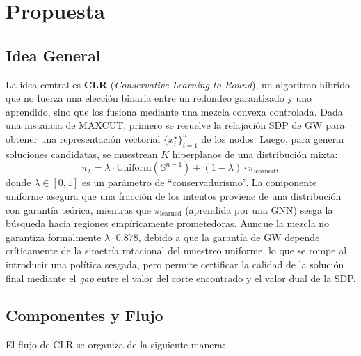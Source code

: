 \documentclass{article}
\begin{document}
\section{Propuesta}

\subsection{Idea General}

La idea central es \textbf{CLR} (\textit{Conservative Learning-to-Round}), un algoritmo híbrido que no fuerza una elección binaria entre un redondeo garantizado y uno aprendido, sino que los fusiona mediante una mezcla convexa controlada. Dada una instancia de MAXCUT, primero se resuelve la relajación SDP de GW para obtener una representación vectorial $\{x_i^\star\}_{i=1}^n$ de los nodos. Luego, para generar soluciones candidatas, se muestrean $K$ hiperplanos de una distribución mixta:
\[
\pi_\lambda = \lambda \cdot \text{Uniform}(\mathbb{S}^{n-1}) + (1 - \lambda) \cdot \pi_{\text{learned}},
\]
donde $\lambda \in [0, 1]$ es un parámetro de ``conservadurismo''. La componente uniforme asegura que una fracción de los intentos proviene de una distribución con garantía teórica, mientras que $\pi_{\text{learned}}$ (aprendida por una GNN) sesga la búsqueda hacia regiones empíricamente prometedoras. Aunque la mezcla no garantiza formalmente $\lambda \cdot 0.878$, debido a que la garantía de GW depende críticamente de la simetría rotacional del muestreo uniforme, lo que se rompe al introducir una política sesgada, pero permite certificar la calidad de la solución final mediante el \textit{gap} entre el valor del corte encontrado y el valor dual de la SDP.

\subsection{Componentes y Flujo}

El flujo de CLR se organiza de la siguiente manera:
\end{document}
